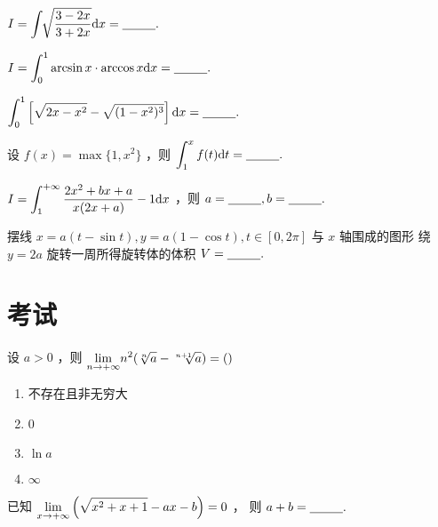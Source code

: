 \begin{quest}[660T52]
    $ \displaystyle I = \int \displaystyle\sqrt[]{\dfrac{3-2x}{3+2x}}\mathrm{d}x = \underline{~~~~~~~~}. $ 
\end{quest}

\begin{quest}[660T59]
    $ \displaystyle I = \int_0^1 \arcsin x \cdot \arccos x \mathrm{d}x =\underline{~~~~~~~~}. $ 
\end{quest}

\begin{quest}[660T60]
    $ \displaystyle \int_0^1\left[\sqrt{2x-x^2}-\sqrt{(1-x^2)^3}\right]\mathrm{d}x = \underline{~~~~~~~~}. $ 
\end{quest}

\begin{quest}[660T64]
    设 $ f(x) = \max \{1,x^2\} $ ，则 $ \displaystyle \int_1^x f(t)\mathrm{d}t = \underline{~~~~~~~~}. $ 
\end{quest}

\begin{quest}[660T68]
    $ \displaystyle I = \int_1^{+\infty} \dfrac{2x^2+bx+a}{x(2x+a)}-1\mathrm{d}x $ ，则 $ a = \underline{~~~~~~~~},b = \underline{~~~~~~~~}. $ 
\end{quest}

\begin{quest}[660T70]
    摆线 $ x = a(t-\sin t),y = a(1-\cos t),t\in[0,2\pi] $ 与 $ x $ 轴围成的图形
    绕 $ y = 2a $ 旋转一周所得旋转体的体积 $ V = \underline{~~~~~~~~}. $
\end{quest}

\section{考试}
\begin{Quest}[C1T5\goto{T1}]
    设 $ a>0 $ ，则 $\displaystyle {\displaystyle\lim_{n\rightarrow +\infty}}n^2(\sqrt[n]a-\sqrt[n+1]a)=() $

    \begin{enumerate}
        \item 不存在且非无穷大
        \item 0
        \item $ \ln a $ 
        \item $ \infty $ 
    \end{enumerate}
\end{Quest}

\begin{Quest}[C1T11\goto{T2}]
    已知 $ {\displaystyle\lim_{x\rightarrow +\infty}}\left(\displaystyle\sqrt{x^2+x+1}-ax-b\right)=0 $ ，
    则 $ a+b=\underline{~~~~~~~~}. $ 
\end{Quest}

